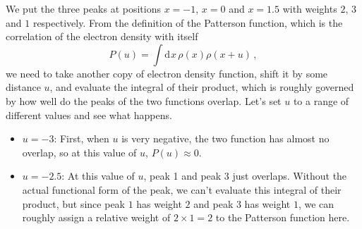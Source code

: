 \documentclass{article}
\theoremstyle{plain}\theoremheaderfont{\normalfont\itshape}\theorembodyfont{\rmfamily}\theoremseparator{.}\newtheorem*{rem}{Remark}\newtheorem*{ex}{Example}\newtheorem*{proof}{Proof}\newtheorem*{altp}{Alternative proof}
\theoremstyle{plain}\theoremheaderfont{\normalfont\bfseries}\theorembodyfont{\rmfamily}\theoremseparator{.}\newtheorem{thm}{Theorem}[section]\newtheorem{lem}[thm]{Lemma}\newtheorem{prop}[thm]{Proposition}\newtheorem*{cor}{Corollary}\newtheorem{defn}[thm]{Definition}\newtheorem{clm}[thm]{Claim}\newtheorem{clminproof}{Claim}\newtheorem*{law}{Law}\newtheorem{pos}[thm]{Postulate}
\theoremstyle{break}\theoremheaderfont{\normalfont\itshape}\theorembodyfont{\rmfamily}\theoremseparator{.\medskip}\newtheorem*{proofskip}{Proof}\newtheorem*{exs}{Examples}\newtheorem*{rems}{Remarks}
\theoremstyle{break}\theoremheaderfont{\normalfont\bfseries}\theorembodyfont{\rmfamily}\theoremseparator{.\medskip}\newtheorem{lemskip}[thm]{Lemma}\newtheorem{defnskip}[thm]{Definition}\newtheorem{propskip}[thm]{Proposition}\newtheorem{thmskip}[thm]{Theorem}
\numberwithin{equation}{section}
\newcommand{\dd}[2][]{\mathrm{d}^{#1} #2\,}
\begin{document}
    We put the three peaks at positions \(x=-1\), \(x=0\) and \(x=1.5\) with weights \(2\), \(3\) and \(1\) respectively. From the definition of the Patterson function, which is the correlation of the electron density with itself
    \begin{equation}
        P(u)=\int\dd{x}\rho(x)\rho(x+u)\,,
    \end{equation}
    we need to take another copy of electron density function, shift it by some distance \(u\), and evaluate the integral of their product, which is roughly governed by how well do the peaks of the two functions overlap. Let's set \(u\) to a range of different values and see what happens.
    \begin{itemize}
        \item \(u=-3\): First, when \(u\) is very negative, the two function has almost no overlap, so at this value of \(u\), \(P(u)\approx 0\).
        \begin{figure}[ht!]
            \centering
        \end{figure}
        \item \(u=-2.5\): At this value of \(u\), peak 1 and peak 3 just overlaps. Without the actual functional form of the peak, we can't evaluate this integral of their product, but since peak \(1\) has weight \(2\) and peak \(3\) has weight \(1\), we can roughly assign a relative weight of \(2\times 1=2\) to the Patterson function here.

\end{itemize}
\end{document}
